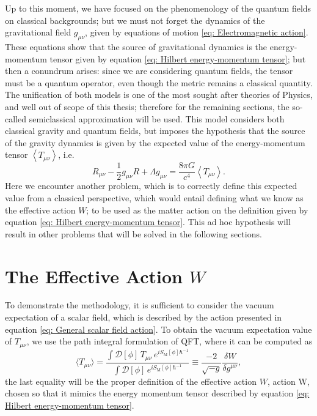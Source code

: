 Up to this moment, we have focused on the phenomenology of the quantum fields on classical backgrounds; but we must not forget the dynamics of the gravitational field $g_{\mu\nu}$, given by equations of motion \ref{eq: Electromagnetic action}. These equations show that the source of gravitational dynamics is the energy-momentum tensor given by equation \ref{eq: Hilbert energy-momentum tensor}; but then a conundrum arises:  since we are considering quantum fields, the tensor must be a quantum operator, even though the metric remains a classical quantity. The unification of both models is one of the most sought after theories of Physics, and well out of scope of this thesis; therefore for the remaining sections, the so-called semiclassical approximation will be used. This model considers both classical gravity and quantum fields, but imposes the hypothesis that the source of the gravity dynamics is given by the expected value of the energy-momentum tensor $\left\langle T_{\mu\nu}\right\rangle$, i.e.
\begin{equation}
	R_{\mu\nu}-\frac{1}{2}g_{\mu\nu}R+\Lambda g_{\mu\nu}=\frac{8\pi G}{c^4}\left\langle T_{\mu\nu}\right\rangle.
\end{equation}
Here we encounter another problem, which is to correctly define this expected value from a classical perspective, which would entail defining what we know as the effective action $W$; to be used as the matter action on the definition given by equation \ref{eq: Hilbert energy-momentum tensor}. This ad hoc hypothesis will result in other problems that will be solved  in the following sections.
\vspace{0.25cm}
\section{The Effective Action $W$}
To demonstrate the methodology, it is sufficient to consider the vacuum expectation of a scalar field, which is described by the action presented in equation \ref{eq: General scalar field action}. To obtain the vacuum expectation value of $T_{\mu\nu}$, we use the path integral formulation of QFT, where it can be computed as
\begin{equation}\label{eq: General effective action definition}
	\langle T_{\mu\nu}\rangle =\frac{\int \mathcal{D}[\phi]\,T_{\mu\nu}\,e^{iS_\text{M}[\phi]\hbar^{-1}}}{\int \mathcal{D}[\phi]\,e^{iS_\text{M}[\phi]\hbar^{-1}}}\equiv \frac{-2}{\sqrt{-g}}\frac{\delta W}{\delta g^{\mu\nu}},
\end{equation}
the last equality will be the proper definition of the effective action $W$, action W, chosen so that it mimics the energy momentum tensor described by equation \ref{eq: Hilbert energy-momentum tensor}.

